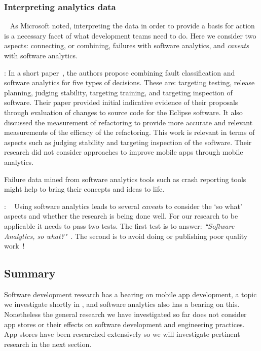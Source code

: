 \subsubsection{Interpreting analytics data}~\label{rw-interpreting-analytics-data-research}
As Microsoft noted, interpreting the data in order to provide a basis for action is a necessary facet of what development teams need to do. Here we consider two aspects: connecting, or combining, failures with software analytics, and \emph{caveats} with software analytics.

: 
In a short paper~, the authors propose combining fault classification and software analytics for five types of decisions. These are: targeting testing, release planning, judging stability, targeting training, and targeting inspection of software. Their paper provided initial indicative evidence of their proposals through evaluation of changes to source code for the Eclipse software. It also discussed the measurement of refactoring to provide more accurate and relevant measurements of the efficacy of the refactoring. This work is relevant in terms of aspects such as judging stability and targeting inspection of the software. Their research did not consider approaches to improve mobile apps through mobile analytics. 

Failure data mined from software analytics tools such as crash reporting tools might help to bring their concepts and ideas to life.

{}: ~\label{rw-caveats-with-software-analytics-topic}
Using software analytics leads to several \emph{caveats} to consider the `so what' aspects and whether the research is being done well. For our research to be applicable it needs to pass two tests. The first test is to answer: 
\emph{``Software Analytics, so what?"}~. The second is to avoid doing or publishing poor quality work~!


\subsection{Summary}
Software development research has a bearing on mobile app development, a topic we investigate shortly in , and software analytics also has a bearing on this. Nonetheless the general research we have investigated so far does not consider app stores or their effects on software development and engineering practices. App stores have been researched extensively so we will investigate pertinent research in the next section.

